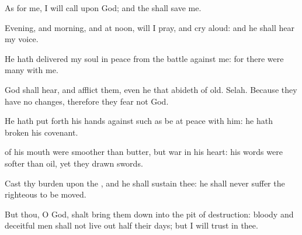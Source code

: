 {\Q {}As for me, I will
call upon
God; and the
{} shall
save me.


\par }{\Q {}Evening, and
morning, and at
noon, will I
pray, and cry
aloud: and he shall
hear my
voice.


\par }{\Q {}He hath
delivered my
soul in
peace from the
battle
{} against me: for there were
many with me.


\par }{\Q {}God shall
hear, and
afflict them, even he that
abideth of
old.
Selah. Because they have no
changes, therefore they
fear not
God.


\par }{\Q {}He hath put
forth his
hands against such as be at
peace with him: he hath
broken his
covenant.


\par }{\Q {} of his
mouth were
smoother than
butter, but
war
{} in his
heart: his
words were
softer than
oil, yet
{} they drawn
swords.


\par }{\Q {}Cast thy
burden upon the
{}, and he shall
sustain thee: he shall
never
suffer the
righteous to be
moved.


\par }{\Q {}But thou, O
God, shalt bring them
down into the
pit of
destruction:
bloody and
deceitful
men shall not live out
half their
days; but I will
trust in thee.




\par }
